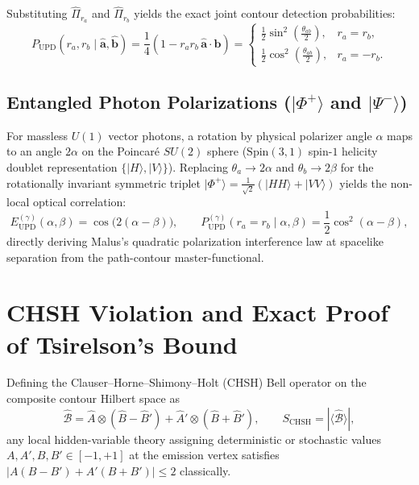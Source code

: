 \documentclass[11pt,a4paper]{article}
\begin{document}
Substituting $\hat{\Pi}_{r_a}$ and $\hat{\Pi}_{r_b}$ yields the exact joint contour detection probabilities:
\begin{equation}
P_{\mathrm{UPD}}(r_a, r_b \mid \hat{\mathbf{a}}, \hat{\mathbf{b}}) = \frac{1}{4}\left( 1 - r_a r_b \, \hat{\mathbf{a}}\cdot\hat{\mathbf{b}} \right) = \begin{cases} \frac{1}{2}\sin^2\!\left(\frac{\theta_{ab}}{2}\right), & r_a = r_b, \\[4pt] \frac{1}{2}\cos^2\!\left(\frac{\theta_{ab}}{2}\right), & r_a = -r_b. \end{cases}
\end{equation}

\subsection{Entangled Photon Polarizations ($|\Phi^+\rangle$ and $|\Psi^-\rangle$)}
For massless $U(1)$ vector photons, a rotation by physical polarizer angle $\alpha$ maps to an angle $2\alpha$ on the Poincaré $SU(2)$ sphere ($\mathrm{Spin}(3,1)$ spin-$1$ helicity doublet representation $\{|H\rangle, |V\rangle\}$). Replacing $\theta_a \to 2\alpha$ and $\theta_b \to 2\beta$ for the rotationally invariant symmetric triplet $|\Phi^+\rangle = \frac{1}{\sqrt{2}}(|HH\rangle + |VV\rangle)$ yields the non-local optical correlation:
\begin{equation}
E_{\mathrm{UPD}}^{(\gamma)}(\alpha, \beta) = \cos\!\big(2(\alpha - \beta)\big), \qquad P_{\mathrm{UPD}}^{(\gamma)}(r_a = r_b \mid \alpha, \beta) = \frac{1}{2}\cos^2(\alpha - \beta),
\end{equation}
directly deriving Malus's quadratic polarization interference law at spacelike separation from the path-contour master-functional.

\section{CHSH Violation and Exact Proof of Tsirelson's Bound}
Defining the Clauser--Horne--Shimony--Holt (CHSH) Bell operator on the composite contour Hilbert space as
\begin{equation}
\hat{\mathcal{B}} = \hat{A} \otimes (\hat{B} - \hat{B}') + \hat{A}' \otimes (\hat{B} + \hat{B}'), \qquad S_{\mathrm{CHSH}} = |\langle \hat{\mathcal{B}} \rangle|,
\end{equation}
any local hidden-variable theory assigning deterministic or stochastic values $A, A', B, B' \in [-1, +1]$ at the emission vertex satisfies $|A(B-B') + A'(B+B')| \le 2$ classically.
\end{document}
